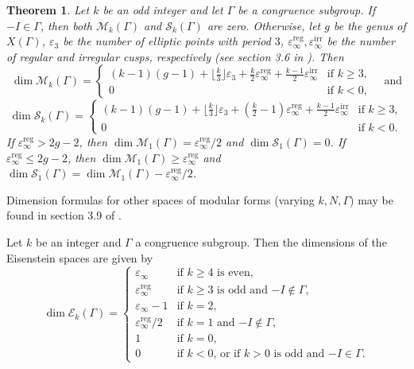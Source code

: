 \documentclass[10pt,leqno,twoside]{article}
\theoremstyle{plain}
\newtheorem{theorem}[lem]{Theorem}
\theoremstyle{definition}
\numberwithin{equation}{section}
\numberwithin{lem}{section}
\begin{document}
\begin{theorem}
    Let $k$ be an odd integer and let $\varGamma$ be a congruence subgroup. If $-I\in\varGamma$, then both $\mathcal M_k(\varGamma)$ and $\mathcal S_k(\varGamma)$ are zero. Otherwise, let $g$ be the genus of $X(\varGamma)$, $\varepsilon_3$ be the number of elliptic points with period $3$, $\varepsilon_\infty^{\mathrm{reg}}, \varepsilon_\infty^{\mathrm{irr}}$ be the number of regular and irregular cusps, respectively \textup{(}see section 3.6 in \cite{diamond}\textup{)}. Then 
    \[\dim \mathcal M_k(\varGamma) = \begin{cases}
        (k-1)(g-1) + \lfloor\frac{k}{3}\rfloor\varepsilon_3 + \frac{k}{2}\varepsilon_\infty^{\mathrm{reg}} + \frac{k-1}{2}\varepsilon_\infty^{\mathrm{irr}} & \text{if $k\geq 3$},\\
        0 & \text{if $k<0$},
    \end{cases}\quad \text{and}\]
    \[\dim \mathcal S_k(\varGamma) = \begin{cases}
        (k-1)(g-1) + \lfloor\frac{k}{3}\rfloor\varepsilon_3 + (\frac{k}{2}-1)\varepsilon_\infty^{\mathrm{reg}} + \frac{k-1}{2}\varepsilon_\infty^{\mathrm{irr}} & \text{if $k\geq 3$},\\
        0 & \text{if $k<0$}.
    \end{cases}\] If $\varepsilon_\infty^{\mathrm{reg}}>2g-2$, then $\dim \mathcal M_1(\varGamma) = \varepsilon_\infty^{\mathrm{reg}}/2$ and $\dim \mathcal S_1(\varGamma) = 0$. If $\varepsilon_\infty^{\mathrm{reg}}\leq 2g-2$, then $\dim \mathcal M_1(\varGamma)\geq \varepsilon_\infty^{\mathrm{reg}}$ and $\dim \mathcal S_1(\varGamma) = \dim \mathcal M_1(\varGamma)- \varepsilon_\infty^{\mathrm{reg}}/2$.
\end{theorem}

Dimension formulas for other spaces of modular forms (varying $k, N, \varGamma$) may be found in section 3.9 of \cite{diamond}.

Let $k$ be an integer and $\varGamma$ a congruence subgroup. Then the dimensions of the Eisenstein spaces are given by 
\[\dim \mathcal E_k(\varGamma) = \begin{cases}
    \varepsilon_\infty & \text{if $k\geq 4$ is even},\\
    \varepsilon_\infty^{\mathrm{reg}} & \text{if $k\geq 3$ is odd and $-I\not\in\varGamma$},\\
    \varepsilon_\infty-1 & \text{if $k=2$},\\
    \varepsilon_\infty^{\mathrm{reg}}/2 & \text{if $k=1$ and $-I\not\in\varGamma$},\\
    1 & \text{if $k=0$},\\
    0 & \text{if $k<0$, or if $k>0$ is odd and $-I\in\varGamma$}.
\end{cases}\]
\end{document}
